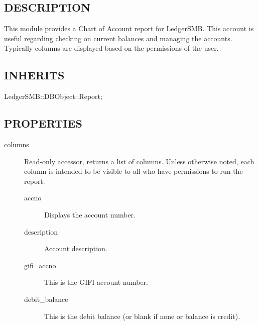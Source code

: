\begin{description}
\begin{description}
\begin{description}
\begin{description}
\begin{description}
\begin{description}
\begin{description}
\begin{description}
\begin{description}
\begin{description}
\subsection*{DESCRIPTION\label{LedgerSMB::DBObject::Report::COA_DESCRIPTION}}


This module provides a Chart of Account report for LedgerSMB.  This account is
useful regarding checking on current balances and managing the accounts.
Typically columns are displayed based on the permissions of the user.

\subsection*{INHERITS\label{LedgerSMB::DBObject::Report::COA_INHERITS}}
\begin{description}

\item[{LedgerSMB::DBObject::Report;}] \mbox{}\end{description}
\subsection*{PROPERTIES\label{LedgerSMB::DBObject::Report::COA_PROPERTIES}}
\begin{description}

\item[{columns}] \mbox{}

Read-only accessor, returns a list of columns.  Unless otherwise noted, each
column is intended to be visible to all who have permissions to run the report.

\begin{description}

\item[{accno}] \mbox{}

Displays the account number.


\item[{description}] \mbox{}

Account description.


\item[{gifi\_accno}] \mbox{}

This is the GIFI account number.


\item[{debit\_balance}] \mbox{}

This is the debit balance (or blank if none or balance is credit).



\end{description}
\end{description}
\end{description}
\end{description}
\end{description}
\end{description}
\end{description}
\end{description}
\end{description}
\end{description}
\end{description}
\end{description}
